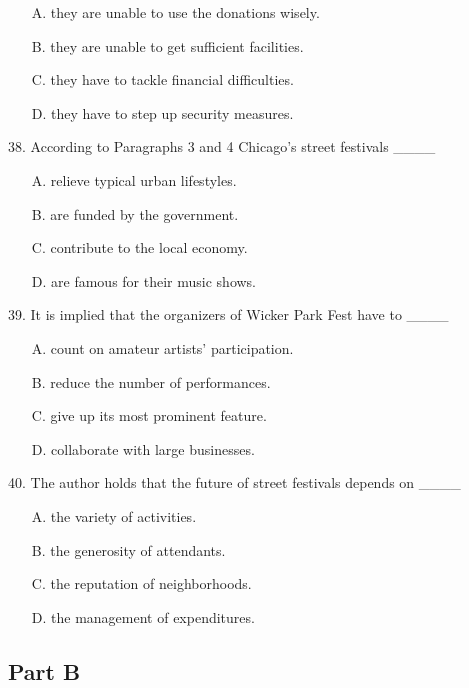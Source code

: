 \documentclass[UTF8,11pt]{ctexart}
\begin{document}
\begin{itemize}[leftmargin=2em,itemsep=.2em,topsep=.4em]\item[A.] they are unable to use the donations wisely.
\item[B.] they are unable to get sufficient facilities.
\item[C.] they have to tackle financial difficulties.
\item[D.] they have to step up security measures.
\end{itemize}

38. According to Paragraphs 3 and 4 Chicago’s street festivals \_\_\_\_


\begin{itemize}[leftmargin=2em,itemsep=.2em,topsep=.4em]\item[A.] relieve typical urban lifestyles.
\item[B.] are funded by the government.
\item[C.] contribute to the local economy.
\item[D.] are famous for their music shows.
\end{itemize}

39. It is implied that the organizers of Wicker Park Fest have to \_\_\_\_


\begin{itemize}[leftmargin=2em,itemsep=.2em,topsep=.4em]\item[A.] count on amateur artists’ participation.
\item[B.] reduce the number of performances.
\item[C.] give up its most prominent feature.
\item[D.] collaborate with large businesses.
\end{itemize}

40. The author holds that the future of street festivals depends on \_\_\_\_


\begin{itemize}[leftmargin=2em,itemsep=.2em,topsep=.4em]\item[A.] the variety of activities.
\item[B.] the generosity of attendants.
\item[C.] the reputation of neighborhoods.
\item[D.] the management of expenditures.
\end{itemize}

\subsection*{\textbf{Part B}}
\end{document}
